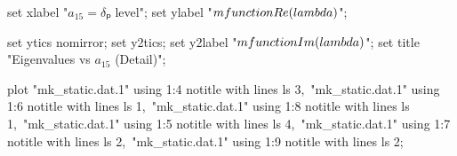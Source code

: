   set xlabel "$a_{15} = δₚ$ level";
  set ylabel "$\\mfunction{Re}(\\lambda)$";

  set ytics nomirror;
  set y2tics;
  set y2label "$\\mfunction{Im}(\\lambda)$";
  set title "Eigenvalues vs $a_{15}$ (Detail)";

  plot "mk_static.dat.1" using 1:4 notitle with lines ls 3,\
       "mk_static.dat.1" using 1:6 notitle with lines ls 1,\
       "mk_static.dat.1" using 1:8 notitle with lines ls 1,\
       "mk_static.dat.1" using 1:5 notitle with lines ls 4,\
       "mk_static.dat.1" using 1:7 notitle with lines ls 2,\
       "mk_static.dat.1" using 1:9 notitle with lines ls 2;
\stopGNUPLOTscript

